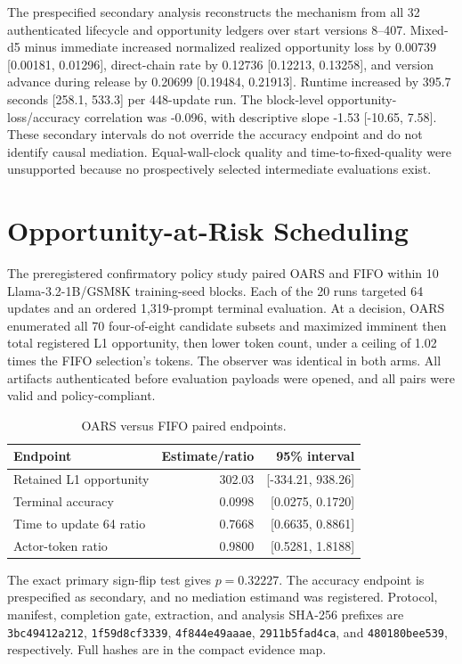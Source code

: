 \documentclass{article}
\begin{document}
The prespecified secondary analysis reconstructs the mechanism from all 32 authenticated lifecycle and opportunity ledgers over start versions 8--407. Mixed-d5 minus immediate increased normalized realized opportunity loss by 0.00739 [0.00181, 0.01296], direct-chain rate by 0.12736 [0.12213, 0.13258], and version advance during release by 0.20699 [0.19484, 0.21913]. Runtime increased by 395.7 seconds [258.1, 533.3] per 448-update run. The block-level opportunity-loss/accuracy correlation was -0.096, with descriptive slope -1.53 [-10.65, 7.58]. These secondary intervals do not override the accuracy endpoint and do not identify causal mediation. Equal-wall-clock quality and time-to-fixed-quality were unsupported because no prospectively selected intermediate evaluations exist.

\section{Opportunity-at-Risk Scheduling}
The preregistered confirmatory policy study paired OARS and FIFO within 10 Llama-3.2-1B/GSM8K training-seed blocks. Each of the 20 runs targeted 64 updates and an ordered 1,319-prompt terminal evaluation. At a decision, OARS enumerated all 70 four-of-eight candidate subsets and maximized imminent then total registered L1 opportunity, then lower token count, under a ceiling of 1.02 times the FIFO selection's tokens. The observer was identical in both arms. All artifacts authenticated before evaluation payloads were opened, and all pairs were valid and policy-compliant.

\begin{table}[h]
\caption{OARS versus FIFO paired endpoints.}
\centering\scriptsize
\begin{tabular}{lrr}
\toprule
Endpoint & Estimate/ratio & 95\% interval \\
\midrule
Retained L1 opportunity & 302.03 & [-334.21, 938.26] \\
Terminal accuracy & 0.0998 & [0.0275, 0.1720] \\
Time to update 64 ratio & 0.7668 & [0.6635, 0.8861] \\
Actor-token ratio & 0.9800 & [0.5281, 1.8188] \\
\bottomrule
\end{tabular}
\end{table}

The exact primary sign-flip test gives $p=0.32227$. The accuracy endpoint is prespecified as secondary, and no mediation estimand was registered. Protocol, manifest, completion gate, extraction, and analysis SHA-256 prefixes are \texttt{3bc49412a212}, \texttt{1f59d8cf3339}, \texttt{4f844e49aaae}, \texttt{2911b5fad4ca}, and \texttt{480180bee539}, respectively. Full hashes are in the compact evidence map.
\end{document}
